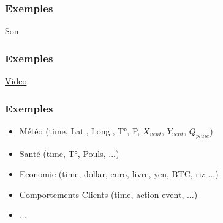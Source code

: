 \begin{frame}
  \frametitle{Exemples}
  \underline{Son}
\end{frame}

\begin{frame}
  \frametitle{Exemples}
  \underline{Video}
\end{frame}

\begin{frame}
  \frametitle{Exemples}
  \begin{itemize}
  \item Météo (time, Lat., Long., T°, P, $X_{vent}$, $Y_{vent}$, $Q_{pluie}$)
  \item Santé (time, T°, Pouls, ...)
  \item Economie (time, dollar, euro, livre, yen, BTC, riz ...)
  \item Comportements Clients (time, action-event, ...)
  \item ...
  \end{itemize}
\end{frame}

